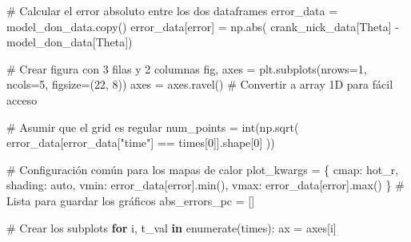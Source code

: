 \documentclass[
  spanish,
  us-letterpaper,
]{scrreprt}
\newenvironment{Shaded}{\begin{snugshade}}{\end{snugshade}}
\newcommand{\BuiltInTok}[1]{\textcolor[rgb]{0.00,0.23,0.31}{#1}}
\newcommand{\CommentTok}[1]{\textcolor[rgb]{0.37,0.37,0.37}{#1}}
\newcommand{\ControlFlowTok}[1]{\textcolor[rgb]{0.00,0.23,0.31}{\textbf{#1}}}
\newcommand{\DecValTok}[1]{\textcolor[rgb]{0.68,0.00,0.00}{#1}}
\newcommand{\KeywordTok}[1]{\textcolor[rgb]{0.00,0.23,0.31}{\textbf{#1}}}
\newcommand{\NormalTok}[1]{\textcolor[rgb]{0.00,0.23,0.31}{#1}}
\newcommand{\OperatorTok}[1]{\textcolor[rgb]{0.37,0.37,0.37}{#1}}
\newcommand{\StringTok}[1]{\textcolor[rgb]{0.13,0.47,0.30}{#1}}
\theoremstyle{plain}
\theoremstyle{definition}
\theoremstyle{remark}
\begin{document}
\begin{Shaded}
\begin{Highlighting}[]
\CommentTok{\# Calcular el error absoluto entre los dos dataframes}
\NormalTok{error\_data }\OperatorTok{=}\NormalTok{ model\_don\_data.copy()}
\NormalTok{error\_data[}\StringTok{\textquotesingle{}error\textquotesingle{}}\NormalTok{] }\OperatorTok{=}\NormalTok{ np.}\BuiltInTok{abs}\NormalTok{(}
\NormalTok{                    crank\_nick\_data[}\StringTok{\textquotesingle{}Theta\textquotesingle{}}\NormalTok{] }\OperatorTok{{-}}\NormalTok{ model\_don\_data[}\StringTok{\textquotesingle{}Theta\textquotesingle{}}\NormalTok{])}

\CommentTok{\# Crear figura con 3 filas y 2 columnas}
\NormalTok{fig, axes }\OperatorTok{=}\NormalTok{ plt.subplots(nrows}\OperatorTok{=}\DecValTok{1}\NormalTok{, ncols}\OperatorTok{=}\DecValTok{5}\NormalTok{, figsize}\OperatorTok{=}\NormalTok{(}\DecValTok{22}\NormalTok{, }\DecValTok{8}\NormalTok{))}
\NormalTok{axes }\OperatorTok{=}\NormalTok{ axes.ravel()  }\CommentTok{\# Convertir a array 1D para fácil acceso}

\CommentTok{\# Asumir que el grid es regular}
\NormalTok{num\_points }\OperatorTok{=} \BuiltInTok{int}\NormalTok{(np.sqrt(}
\NormalTok{                    error\_data[error\_data[}\StringTok{"time"}\NormalTok{] }\OperatorTok{==}\NormalTok{ times[}\DecValTok{0}\NormalTok{]].shape[}\DecValTok{0}\NormalTok{]}
\NormalTok{                    ))}

\CommentTok{\# Configuración común para los mapas de calor}
\NormalTok{plot\_kwargs }\OperatorTok{=}\NormalTok{ \{}
    \StringTok{\textquotesingle{}cmap\textquotesingle{}}\NormalTok{: }\StringTok{\textquotesingle{}hot\_r\textquotesingle{}}\NormalTok{,}
    \StringTok{\textquotesingle{}shading\textquotesingle{}}\NormalTok{: }\StringTok{\textquotesingle{}auto\textquotesingle{}}\NormalTok{,}
    \StringTok{\textquotesingle{}vmin\textquotesingle{}}\NormalTok{: error\_data[}\StringTok{\textquotesingle{}error\textquotesingle{}}\NormalTok{].}\BuiltInTok{min}\NormalTok{(),}
    \StringTok{\textquotesingle{}vmax\textquotesingle{}}\NormalTok{: error\_data[}\StringTok{\textquotesingle{}error\textquotesingle{}}\NormalTok{].}\BuiltInTok{max}\NormalTok{()}
\NormalTok{\}}
\CommentTok{\# Lista para guardar los gráficos}
\NormalTok{abs\_errors\_pc }\OperatorTok{=}\NormalTok{ []}

\CommentTok{\# Crear los subplots}
\ControlFlowTok{for}\NormalTok{ i, t\_val }\KeywordTok{in} \BuiltInTok{enumerate}\NormalTok{(times):}
\NormalTok{    ax }\OperatorTok{=}\NormalTok{ axes[i]}
    

\end{Highlighting}
\end{Shaded}
\end{document}
